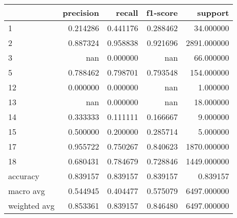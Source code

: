 \begin{tabular}{lrrrr}
\toprule
 & precision & recall & f1-score & support \\
\midrule
1 & 0.214286 & 0.441176 & 0.288462 & 34.000000 \\
2 & 0.887324 & 0.958838 & 0.921696 & 2891.000000 \\
3 & nan & 0.000000 & nan & 66.000000 \\
5 & 0.788462 & 0.798701 & 0.793548 & 154.000000 \\
12 & 0.000000 & 0.000000 & nan & 1.000000 \\
13 & nan & 0.000000 & nan & 18.000000 \\
14 & 0.333333 & 0.111111 & 0.166667 & 9.000000 \\
15 & 0.500000 & 0.200000 & 0.285714 & 5.000000 \\
17 & 0.955722 & 0.750267 & 0.840623 & 1870.000000 \\
18 & 0.680431 & 0.784679 & 0.728846 & 1449.000000 \\
accuracy & 0.839157 & 0.839157 & 0.839157 & 0.839157 \\
macro avg & 0.544945 & 0.404477 & 0.575079 & 6497.000000 \\
weighted avg & 0.853361 & 0.839157 & 0.846480 & 6497.000000 \\
\bottomrule
\end{tabular}
